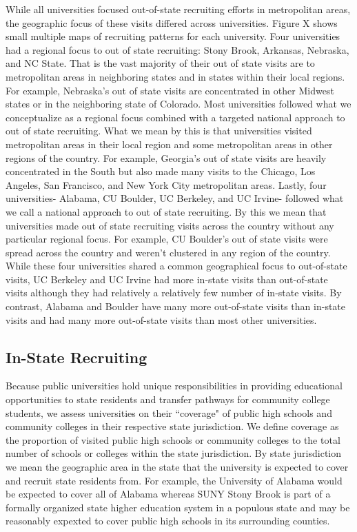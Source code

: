 \documentclass[twoside]{article}
\begin{document}
While all universities focused out-of-state recruiting efforts in metropolitan areas, the geographic focus of these visits differed across universities. Figure X shows small multiple maps of recruiting patterns for each university. Four universities had a regional focus to out of state recruiting: Stony Brook, Arkansas, Nebraska, and NC State. That is the vast majority of their out of state visits are to metropolitan areas in neighboring states and in states within their local regions. For example, Nebraska's out of state visits are concentrated in other Midwest states or in the neighboring state of Colorado. Most universities followed what we conceptualize as a regional focus combined with a targeted national approach to out of state recruiting. What we mean by this is that universities visited metropolitan areas in their local region and some metropolitan areas in other regions of the country. For example, Georgia's out of state visits are heavily concentrated in the South but also made many visits to the Chicago, Los Angeles, San Francisco, and New York City metropolitan areas. Lastly, four universities- Alabama, CU Boulder, UC Berkeley, and UC Irvine- followed what we call a national approach to out of state recruiting. By this we mean that universities made out of state recruiting visits across the country without any particular regional focus. For example, CU Boulder's out of state visits were spread across the country and weren't clustered in any region of the country.  While these four universities shared a common geographical focus to out-of-state visits, UC Berkeley and UC Irvine had more in-state visits than out-of-state visits although they had relatively a relatively few number of in-state visits. By contrast, Alabama and Boulder have many more out-of-state visits than in-state visits and had many more out-of-state visits than most other universities. 

\subsection*{In-State Recruiting}
Because public universities hold unique responsibilities in providing educational opportunities to state residents and transfer pathways for community college students, we assess universities on their ``coverage" of public high schools and community colleges in their respective state jurisdiction. We define coverage as the proportion of visited public high schools or community colleges to the total number of schools or colleges within the state jurisdiction. By state jurisdiction we mean the geographic area in the state that the university is expected to cover and recruit state residents from. For example, the University of Alabama would be expected to cover all of Alabama whereas SUNY Stony Brook is part of a formally organized state higher education system in a populous state and may be reasonably expexted to cover public high schools in its surrounding counties.
\end{document}
